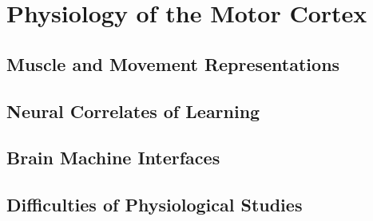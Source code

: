 \section{Physiology of the Motor Cortex}

\subsection{Muscle and Movement Representations}

\subsection{Neural Correlates of Learning}

\subsection{Brain Machine Interfaces}

\subsection{Difficulties of Physiological Studies}
